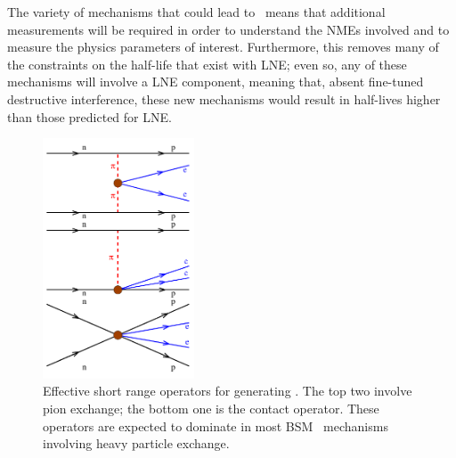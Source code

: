 \documentclass[/main.tex]{subfiles}
\begin{document}
The variety of mechanisms that could lead to \znbb\ means that additional measurements will be required in order to understand the NMEs involved and to measure the physics parameters of interest.
Furthermore, this removes many of the constraints on the half-life that exist with LNE; even so, any of these mechanisms will involve a LNE component, meaning that, absent fine-tuned destructive interference, these new mechanisms would result in half-lives higher than those predicted for LNE.
\begin{figure}[t]
  \centering
  \includegraphics[width=0.4\textwidth]{znbbshortrange}
  \caption[Effective Pion Exchange Operators for \znbb]{\label{fig:znbbeffpion}
    Effective short range operators for generating \znbb. The top two involve pion exchange; the bottom one is the contact operator. These operators are expected to dominate in most BSM \znbb\ mechanisms involving heavy particle exchange.
  }
\end{figure}
\end{document}

